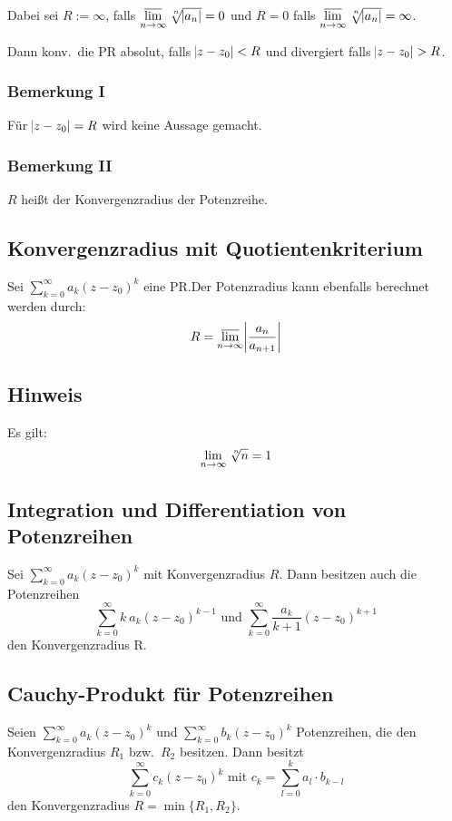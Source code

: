 Dabei sei $R:=\infty$, falls
$\varlimsup\limits_{n \rightarrow \infty} \nthSqrt{n}{\abs{a_n}} = 0$ und
$R=0$ falls
$\varlimsup\limits_{n \rightarrow \infty} \nthSqrt{n}{\abs{a_n}} = \infty$.

Dann konv.\ die PR absolut, falls $\abs{z - z_0} < R$ und divergiert falls
$\abs{z - z_0} > R$.

\subsubsection{Bemerkung I} Für $\abs{z - z_0} = R$ wird keine Aussage gemacht.

\subsubsection{Bemerkung II} $R$ heißt der Konvergenzradius der Potenzreihe.

\subsection{Konvergenzradius mit Quotientenkriterium}
Sei $\sum_{k=0}^\infty a_k {(z - z_0)}^k$ eine PR.\@ Der Potenzradius kann
ebenfalls berechnet werden durch:
\begin{equation*}
    R = \varlimsup_{n \rightarrow \infty} \abs{\frac{a_n}{a_{n+1}}}
\end{equation*}

\subsection{Hinweis}
Es gilt:
\begin{equation*}
    \lim_{n \rightarrow \infty} \nthSqrt{n}{n} = 1
\end{equation*}

\subsection{Integration und Differentiation von Potenzreihen}
Sei $\sum_{k=0}^\infty a_k {(z - z_0)}^k$ mit Konvergenzradius $R$. Dann besitzen
auch die Potenzreihen
\begin{equation*}
    \sum_{k=0}^\infty k\: a_k {(z - z_0)}^{k-1} \text{ und }
    \sum_{k=0}^\infty \frac{a_k}{k+1} {(z-z_0)}^{k+1}
\end{equation*}
den Konvergenzradius R.

\subsection{Cauchy-Produkt für Potenzreihen}
Seien $\sum_{k=0}^\infty a_k {(z-z_0)}^k$ und
$\sum_{k=0}^\infty b_k {(z-z_0)}^k$ Potenzreihen, die den Konvergenzradius
$R_1$ bzw.\ $R_2$ besitzen. Dann besitzt
\begin{equation*}
        \sum_{k=0}^\infty c_k {(z-z_0)}^k \text{ mit }
        c_k = \sum_{l=0}^k a_l \cdot b_{k-l}
\end{equation*}
den Konvergenzradius $R = \min \{R_1, R_2\}$.

